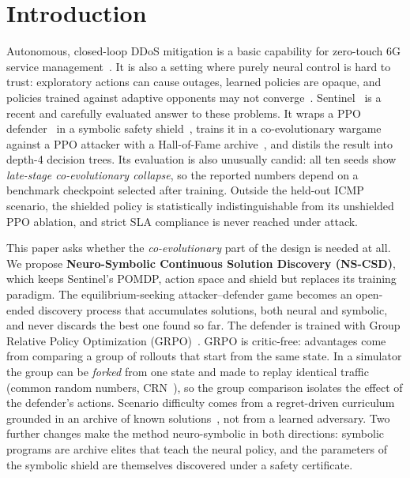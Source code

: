 \section{Introduction}
Autonomous, closed-loop DDoS mitigation is a basic capability for zero-touch
6G service management~\cite{benzaid2020zsm,liyanage2023oran}. It is also a
setting where purely neural control is hard to trust: exploratory actions can
cause outages, learned policies are opaque, and policies trained against
adaptive opponents may not converge~\cite{guo2020xai6g,senevirathna2025xaib5gsec}.
Sentinel~\cite{alfatemi2026sentinel} is a recent and carefully evaluated
answer to these problems. It wraps a PPO defender~\cite{schulman2017ppo} in a
symbolic safety shield~\cite{alshiekh2018shielding}, trains it in a co-evolutionary
wargame against a PPO attacker with a Hall-of-Fame archive~\cite{rosin1997newmethods},
and distils the result into depth-4 decision trees. Its evaluation is also
unusually candid: all ten seeds show \emph{late-stage co-evolutionary
collapse}, so the reported numbers depend on a benchmark checkpoint selected
after training. Outside the held-out ICMP scenario, the shielded policy is
statistically indistinguishable from its unshielded PPO ablation, and strict SLA
compliance is never reached under attack.

This paper asks whether the \emph{co-evolutionary} part of the design is needed
at all. We propose \textbf{Neuro-Symbolic Continuous Solution Discovery
(NS-CSD)}, which keeps Sentinel's POMDP, action space and shield but replaces
its training paradigm. The equilibrium-seeking attacker--defender game becomes
an open-ended discovery process that accumulates solutions, both neural and
symbolic, and never discards the best one found so far. The defender is trained with Group
Relative Policy Optimization (GRPO)~\cite{shao2024deepseekmath}. GRPO is
critic-free: advantages come from comparing a group of rollouts that start
from the same state. In a simulator the group can be \emph{forked} from one
state and made to replay identical traffic (common random numbers,
CRN~\cite{ng2000pegasus}), so the group comparison isolates the effect of the
defender's actions. Scenario difficulty comes from a regret-driven curriculum
grounded in an archive of known solutions~\cite{jiang2021plr,parkerholder2022accel},
not from a learned adversary. Two further changes make the method
neuro-symbolic in both directions: symbolic programs are archive elites that
teach the neural policy, and the parameters of the symbolic shield are
themselves discovered under a safety certificate.

